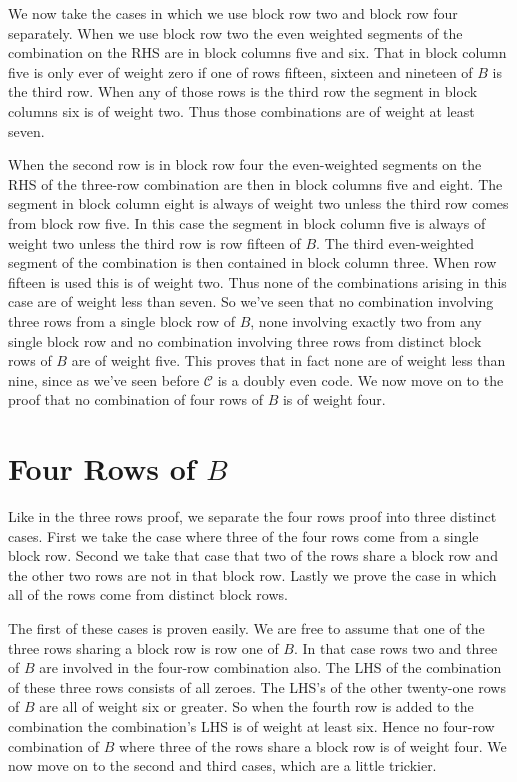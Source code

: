 We now take the cases in which we use block row two and block row four separately.
When we use block row two the even weighted segments of the combination on the RHS are in block columns five and six.
That in block column five is only ever of weight zero if one of rows fifteen, sixteen and nineteen of $B$ is the third row.
When any of those rows is the third row the segment in block columns six is of weight two.
Thus those combinations are of weight at least seven.

When the second row is in block row four the even-weighted segments on the RHS of the three-row combination are then in block columns five and eight.
The segment in block column eight is always of weight two unless the third row comes from block row five.
In this case the segment in block column five is always of weight two unless the third row is row fifteen of $B$.
The third even-weighted segment of the combination is then contained in block column three.
When row fifteen is used this is of weight two.
Thus none of the combinations arising in this case are of weight less than seven.
So we've seen that no combination involving three rows from a single block row of $B$, none involving exactly two from any single block row and no combination involving three rows from distinct block rows of $B$ are of weight five.
This proves that in fact none are of weight less than nine, since as we've seen before $\mathcal{C}$ is a doubly even code.
We now move on to the proof that no combination of four rows of $B$ is of weight four.

\section{Four Rows of $B$}
Like in the three rows proof, we separate the four rows proof into three distinct cases.
First we take the case where three of the four rows come from a single block row.
Second we take that case that two of the rows share a block row and the other two rows are not in that block row.
Lastly we prove the case in which all of the rows come from distinct block rows.

The first of these cases is proven easily.
We are free to assume that one of the three rows sharing a block row is row one of $B$.
In that case rows two and three of $B$ are involved in the four-row combination also.
The LHS of the combination of these three rows consists of all zeroes.
The LHS's of the other twenty-one rows of $B$ are all of weight six or greater.
So when the fourth row is added to the combination the combination's LHS is of weight at least six.
Hence no four-row combination of $B$ where three of the rows share a block row is of weight four.
We now move on to the second and third cases, which are a little trickier.

